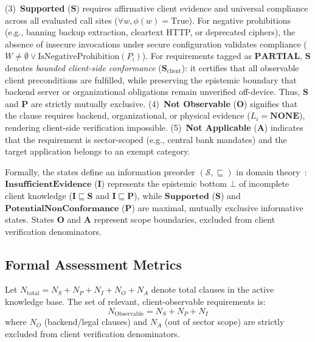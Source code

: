 (3)~\textbf{Supported} ($\mathbf{S}$) requires affirmative client evidence and universal compliance across all evaluated call sites ($\forall w, \phi(w) = \text{True}$). For negative prohibitions (e.g., banning backup extraction, cleartext HTTP, or deprecated ciphers), the absence of insecure invocations under secure configuration validates compliance ($W \neq \emptyset \vee \text{IsNegativeProhibition}(P_i)$). For requirements tagged as $\mathbf{PARTIAL}$, $\mathbf{S}$ denotes \textit{bounded client-side conformance} ($\mathbf{S}_{\text{client}}$): it certifies that all observable client preconditions are fulfilled, while preserving the epistemic boundary that backend server or organizational obligations remain unverified off-device. Thus, $\mathbf{S}$ and $\mathbf{P}$ are strictly mutually exclusive.
(4)~\textbf{Not Observable} ($\mathbf{O}$) signifies that the clause requires backend, organizational, or physical evidence ($L_i = \mathbf{NONE}$), rendering client-side verification impossible.
(5)~\textbf{Not Applicable} ($\mathbf{A}$) indicates that the requirement is sector-scoped (e.g., central bank mandates) and the target application belongs to an exempt category.

Formally, the states define an information preorder $(\mathcal{S}, \sqsubseteq)$ in domain theory~\cite{davey_priestley_lattices, belnap_four_valued}: $\mathbf{InsufficientEvidence}$ ($\mathbf{I}$) represents the epistemic bottom $\bot$ of incomplete client knowledge ($\mathbf{I} \sqsubseteq \mathbf{S}$ and $\mathbf{I} \sqsubseteq \mathbf{P}$), while $\mathbf{Supported}$ ($\mathbf{S}$) and $\mathbf{PotentialNonConformance}$ ($\mathbf{P}$) are maximal, mutually exclusive informative states. States $\mathbf{O}$ and $\mathbf{A}$ represent scope boundaries, excluded from client verification denominators.

\subsection{Formal Assessment Metrics}
\label{sec:assessment:metrics}

Let $N_{\text{total}} = N_S + N_P + N_I + N_O + N_A$ denote total clauses in the active knowledge base. The set of relevant, client-observable requirements is:
\begin{equation}
\label{eq:assessment:obs}
N_{\text{Observable}} = N_S + N_P + N_I
\end{equation}
where $N_O$ (backend/legal clauses) and $N_A$ (out of sector scope) are strictly excluded from client verification denominators.

